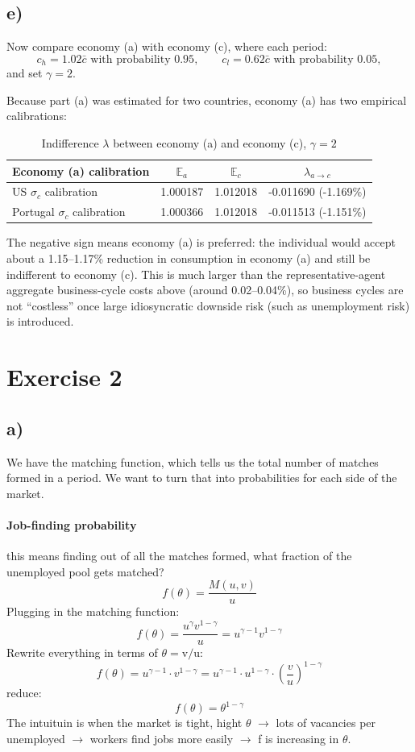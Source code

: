 \documentclass[12pt]{article}
\begin{document}
\subsection{e)}

Now compare economy (a) with economy (c), where each period:
$$
c_h=1.02\bar c \text{ with probability }0.95, \qquad
c_l=0.62\bar c \text{ with probability }0.05,
$$
and set $\gamma=2$.

Because part (a) was estimated for two countries, economy (a) has two empirical calibrations:
\begin{table}[H]
\centering
\caption{Indifference $\lambda$ between economy (a) and economy (c), $\gamma=2$}
\label{tab:ex1e}
\begin{tabular}{lccc}
\toprule
Economy (a) calibration & $\mathbb{E}_a$ & $\mathbb{E}_c$ & $\lambda_{a\to c}$ \\
\midrule
US $\sigma_c$ calibration & 1.000187 & 1.012018 & -0.011690 \;(-1.169\%) \\
Portugal $\sigma_c$ calibration & 1.000366 & 1.012018 & -0.011513 \;(-1.151\%) \\
\bottomrule
\end{tabular}
\end{table}

The negative sign means economy (a) is preferred: the individual would accept about a 1.15--1.17\% reduction in consumption in economy (a) and still be indifferent to economy (c). This is much larger than the representative-agent aggregate business-cycle costs above (around 0.02--0.04\%), so business cycles are not ``costless'' once large idiosyncratic downside risk (such as unemployment risk) is introduced.


\section{Exercise 2}
\subsection{a)}
We have the matching function, which tells us the total number of matches formed in a period. We want to turn that into probabilities for each side of the market.
\paragraph{Job-finding probability}
this means finding out of all the matches formed, what fraction of the unemployed pool gets matched?
$$
f(\theta)=\frac{M(u, v)}{u}
$$
Plugging in the matching function:
$$
f(\theta)=\frac{u^\gamma v^{1-\gamma}}{u}=u^{\gamma-1} v^{1-\gamma}
$$
Rewrite everything in terms of $\theta=\mathrm{v} / \mathrm{u}$:
$$
f(\theta)=u^{\gamma-1} \cdot v^{1-\gamma}=u^{\gamma-1} \cdot u^{1-\gamma} \cdot\left(\frac{v}{u}\right)^{1-\gamma}
$$
reduce:
$$
\boxed{f(\theta)=\theta^{1-\gamma}}
$$
The intuituin is when the market is tight, hight $\theta$ $\rightarrow$ lots of vacancies per unemployed $\rightarrow$ workers find jobs more easily $\rightarrow$ f is increasing in $\theta$.
\end{document}
